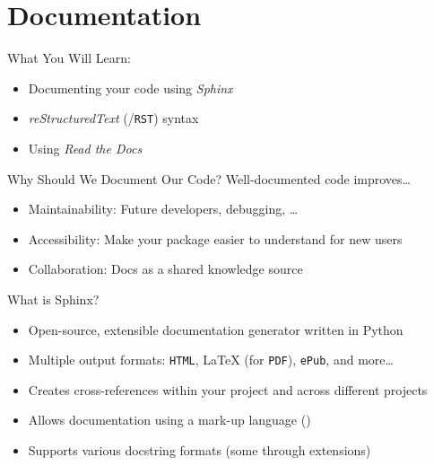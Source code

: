 \section{Documentation}


\begin{frame}[fragile]{What You Will Learn:}
  \begin{itemize}
    \item Documenting your code using \emph{Sphinx}
    \item \emph{reStructuredText} (\reST/\texttt{RST}) syntax
    \item Using \emph{Read the Docs}
  \end{itemize}
\end{frame}


\begin{frame}[fragile]{Why Should We Document Our Code?}
  Well-documented code improves\dots
  \begin{itemize}
    \item Maintainability: Future developers, debugging, \dots
    \item Accessibility: Make your package easier to understand for new users
    \item Collaboration: Docs as a shared knowledge source
  \end{itemize}
\end{frame}


\begin{frame}[fragile]{
  What is Sphinx?
  \hfill
  }
  \begin{itemize}
    \item Open-source, extensible documentation generator written in Python
    \item Multiple output formats: \texttt{HTML}, \LaTeX{} (for \texttt{PDF}), \texttt{ePub}, and more\dots
    \item Creates cross-references within your project and across different projects
    \item Allows documentation using a mark-up language (\reST)
    \item Supports various docstring formats (some through extensions)
  \end{itemize}
\end{frame}



